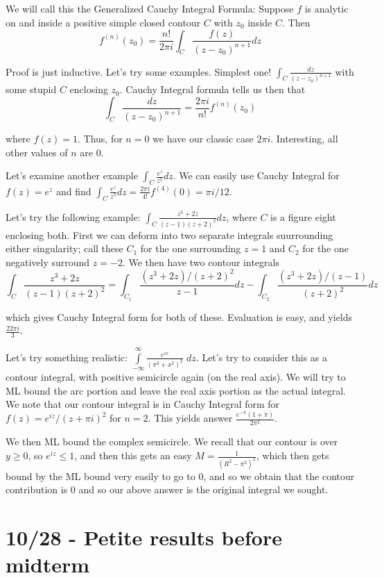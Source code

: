 \documentclass[10pt]{report}
\begin{document}
We will call this the Generalized Cauchy Integral Formula: Suppose $f$ is analytic on and inside a positive simple closed contour $C$ with $z_0$ inside $C$. Then
$$f^{(n)}(z_0) = \frac{n!}{2\pi i} \int_C \frac{f(z)}{(z-z_0)^{n+1}}dz$$

Proof is just inductive. Let's try some examples. Simplest one! $\int_C \frac{dz}{(z-z_0)^{n+1}}$ with some stupid $C$ enclosing $z_0$. Cauchy Integral formula tells us then that
$$\int_C \frac{dz}{(z-z_0)^{n+1}} = \frac{2\pi i}{n!}f^{(n)}(z_0)$$

where $f(z) = 1$. Thus, for $n=0$ we have our classic case $2\pi i$. Interesting, all other values of $n$ are $0$. 

Let's examine another example $\int_C \frac{e^z}{z^5}dz$. We can easily use Cauchy Integral for $f(z) = e^z$ and find $\int_C \frac{e^z}{z^5}dz = \frac{2\pi i}{4!}f^{(4)}(0) = \pi i/12$.

Let's try the following example: $\int_C \frac{z^3 + 2z}{(z-1)(z+2)^2} dz$, where $C$ is a figure eight enclosing both. First we can deform into two separate integrals suurrounding either singularity; call these $C_1$ for the one surrounding $z=1$ and $C_2$ for the one negatively surround $z=-2$. We then have two contour integrals
$$\int_C \frac{z^3+2z}{(z-1)(z+2)^2} = \int_{C_1} \frac{(z^3+2z)/(z+2)^2}{z-1}dz - \int_{C_2} \frac{(z^3+2z)/(z-1)}{(z+2)^2} dz$$

which gives Cauchy Integral form for both of these. Evaluation is easy, and yields $\frac{22\pi i}{3}$.

Let's try something realistic: $\displaystyle\int\limits_{-\infty}^{\infty}\frac{e^{ix}}{\left( \pi^2+x^2 \right)^2}\;dz$. Let's try to consider this as a contour integral, with positive semicircle again (on the real axis). We will try to ML bound the arc portion and leave the real axis portion as the actual integral. We note that our contour integral is in Cauchy Integral form for $f(z) = e^{iz}/(z+\pi i)^2$ for $n=2$. This yields answer $\frac{e^{-\pi}(1+\pi)}{2\pi^2}$.

We then ML bound the complex semicircle. We recall that our contour is over $y \geq 0$, so $e^{iz} \leq 1$, and then this gets an easy $M=\frac{1}{(R^2-\pi^2)^2}$, which then gets bound by the ML bound very easily to go to $0$, and so we obtain that the contour contribution is $0$ and so our above answer is the original integral we sought. 

\chapter{10/28 - Petite results before midterm}
\end{document}
